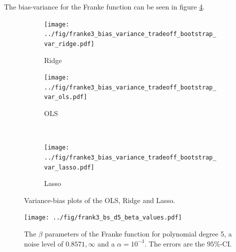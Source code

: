 \documentclass[11pt]{article}
\begin{document}
The bias-variance for the Franke function can be seen in figure \ref{fig:bias-var-franke}.

\begin{figure}
    \centering
    \begin{subfigure}[b]{0.5\textwidth}
        \centering
        \texttt{[image: ../fig/franke3\_bias\_variance\_tradeoff\_bootstrap\_var\_ridge.pdf]}
        \caption{Ridge}
        \label{fig:biasvar-ridge-franke}
    \end{subfigure}%
    \begin{subfigure}[b]{0.5\textwidth}
        \centering
        \texttt{[image: ../fig/franke3\_bias\_variance\_tradeoff\_bootstrap\_var\_ols.pdf]}
        \caption{OLS}
        \label{fig:biasvar-OLSfranke}
    \end{subfigure} \\
    \begin{subfigure}[b]{0.5\textwidth}
        \centering
        \texttt{[image: ../fig/franke3\_bias\_variance\_tradeoff\_bootstrap\_var\_lasso.pdf]}
        \caption{Lasso}
        \label{fig:biasvar-bs-franke}
    \end{subfigure}
    \caption{Variance-bias plots of the OLS, Ridge and Lasso.}
    \label{fig:bias-var-franke}
\end{figure}



\begin{figure}[H]
    \centering
    \texttt{[image: ../fig/frank3\_bs\_d5\_beta\_values.pdf]}
    \caption{The $\beta$ parameters of the Franke function for polynomial degree 5, a noise level of $\mathcal{0.8571,\infty}$ and a $\alpha=10^{-3}$. The errors are the $95\%$-CI.}
    \label{fig:franke_beta_parmas}
\end{figure}
\end{document}
